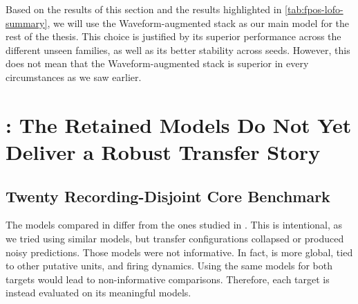\begin{table}[H]
    \centering
    \caption{Leave-one-family-out summary across families for the five main compared \fpos{} models. Mean and standard deviation are computed across the five family \rsq{} values, and mean rank is computed within-family with rank 1 denoting the strongest model.}
    \label{tab:fpos-lofo-summary}
    \small
\end{table}

Based on the results of this section and the results highlighted in \cref{tab:fpos-lofo-summary}, we will use the Waveform-augmented stack as our main model for the rest of the thesis. This choice is justified by its superior performance across the different unseen families, as well as its better stability across seeds. However, this does not mean that the Waveform-augmented stack is superior in every circumstances as we saw earlier.

\section{\fmiss{}: The Retained Models Do Not Yet Deliver a Robust Transfer Story}

\subsection{Twenty Recording-Disjoint Core Benchmark}

The models compared in \fmiss{} differ from the ones studied in \fpos{}. This is intentional, as we tried using similar models, but \fmiss{} transfer configurations collapsed or produced noisy predictions. Those models were not informative. In fact, \fmiss{} is more global, tied to other putative units, and firing dynamics. Using the same models for both targets would lead to non-informative comparisons. Therefore, each target is instead evaluated on its meaningful models.

